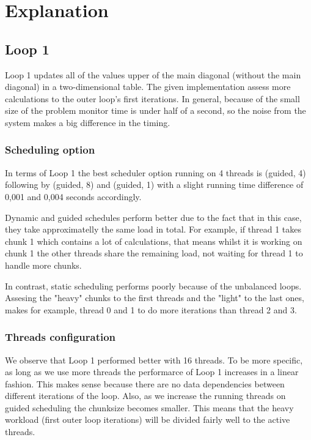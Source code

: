 \section{Explanation}

\subsection{Loop 1}

Loop 1 updates all of the values upper of the main diagonal (without the main diagonal) in a two-dimensional table. The given implementation assess more calculations to the outer loop's first iterations. In general, because of the small size of the problem monitor time is under half of a second, so the noise from the system makes a big difference in the timing.

\subsubsection{Scheduling option}
In terms of Loop 1 the best scheduler option running on 4 threads is (guided, 4) following by (guided, 8) and (guided, 1) with a slight running time difference of 0,001 and 0,004 seconds accordingly.

Dynamic and guided schedules perform better due to the fact that in this case, they take approximatelly the same load in total. For example, if thread 1 takes chunk 1 which contains a lot of calculations, that means whilst it is working on chunk 1 the other threads share the remaining load, not waiting for thread 1 to handle more chunks.

In contrast, static scheduling performs poorly because of the unbalanced loops. Assesing the "heavy" chunks to the first threads and the "light" to the last ones, makes for example, thread 0 and 1 to do more iterations than thread 2 and 3.

\subsubsection{Threads configuration}
We observe that Loop 1 performed better with 16 threads. To be more specific, as long as we use more threads the performarce of Loop 1 increases in a linear fashion. This makes sense because there are no data dependencies between different iterations of the loop. Also, as we increase the running threads on guided scheduling the chunksize becomes smaller. This means that the heavy workload (first outer loop iterations) will be divided fairly well to the active threads.

